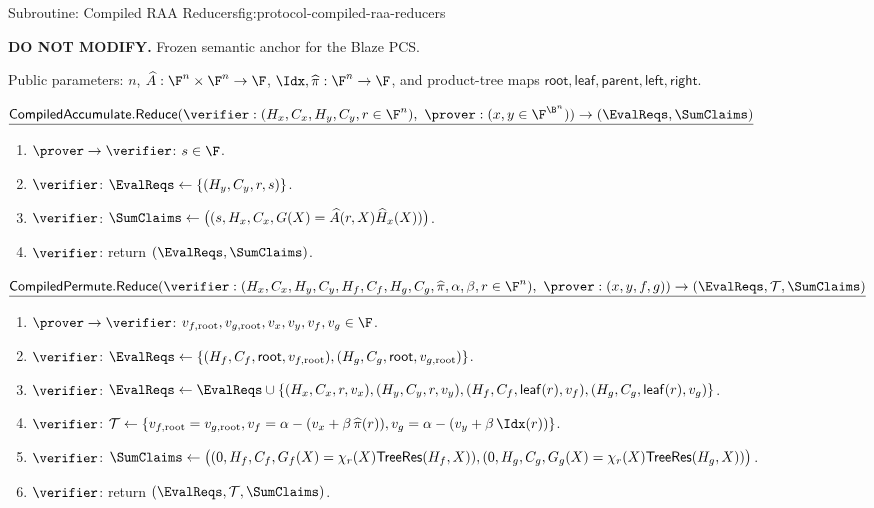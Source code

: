 \begin{protocolbox}{Subroutine: Compiled RAA Reducers}{fig:protocol-compiled-raa-reducers}
\scriptsize\raggedright
\noindent\textbf{DO NOT MODIFY.} Frozen semantic anchor for the Blaze PCS.

\smallskip
\noindent Public parameters: \(n\), \(\widehat A:\F^n\times\F^n\to\F\),
\(\Idx,\widehat\pi:\F^n\to\F\), and product-tree maps
\(\mathsf{root},\mathsf{leaf},\mathsf{parent},\mathsf{left},\mathsf{right}\).

\smallskip
\noindent\(\underline{\mathsf{CompiledAccumulate.Reduce}(\verifier:(H_x,C_x,H_y,C_y,r\in\F^n),\ \prover:(x,y\in\F^{\B^n}))\to(\EvalReqs,\SumClaims)}\)

\smallskip
\begin{enumerate}[leftmargin=0.24in,label=\textbf{CA\arabic*.},itemsep=0.06em,topsep=0.06em,parsep=0pt]
  \item \(\prover\to\verifier\): \(s\in\F\).
  \item \(\verifier\): \(\EvalReqs\gets\{(H_y,C_y,r,s)\}\).
  \item \(\verifier\): \(\SumClaims\gets\bigl((s,H_x,C_x,G(X)=\widehat A(r,X)\widehat H_x(X))\bigr)\).
  \item \(\verifier\): return \((\EvalReqs,\SumClaims)\).
\end{enumerate}

\smallskip
\noindent\(\underline{\mathsf{CompiledPermute.Reduce}(\verifier:(H_x,C_x,H_y,C_y,H_f,C_f,H_g,C_g,\widehat\pi,\alpha,\beta,r\in\F^n),\ \prover:(x,y,f,g))\to(\EvalReqs,\mathcal T,\SumClaims)}\)

\smallskip
\begin{enumerate}[leftmargin=0.24in,label=\textbf{CP\arabic*.},itemsep=0.06em,topsep=0.06em,parsep=0pt]
  \item \(\prover\to\verifier\): \(v_{f,\mathrm{root}},v_{g,\mathrm{root}},
        v_x,v_y,v_f,v_g\in\F\).
  \item \(\verifier\): \(\EvalReqs\gets
        \{(H_f,C_f,\mathsf{root},v_{f,\mathrm{root}}),
        (H_g,C_g,\mathsf{root},v_{g,\mathrm{root}})\}\).
  \item \(\verifier\): \(\EvalReqs\gets\EvalReqs\cup
        \{(H_x,C_x,r,v_x),(H_y,C_y,r,v_y),
        (H_f,C_f,\mathsf{leaf}(r),v_f),(H_g,C_g,\mathsf{leaf}(r),v_g)\}\).
  \item \(\verifier\): \(\mathcal T\gets
        \{v_{f,\mathrm{root}}=v_{g,\mathrm{root}},
        v_f=\alpha-(v_x+\beta\,\widehat\pi(r)),
        v_g=\alpha-(v_y+\beta\,\Idx(r))\}\).
  \item \(\verifier\): \(\SumClaims\gets\bigl((0,H_f,C_f,G_f(X)=\chi_r(X)\mathsf{TreeRes}(H_f,X)),(0,H_g,C_g,G_g(X)=\chi_r(X)\mathsf{TreeRes}(H_g,X))\bigr)\).
  \item \(\verifier\): return \((\EvalReqs,\mathcal T,\SumClaims)\).
\end{enumerate}
\end{protocolbox}

